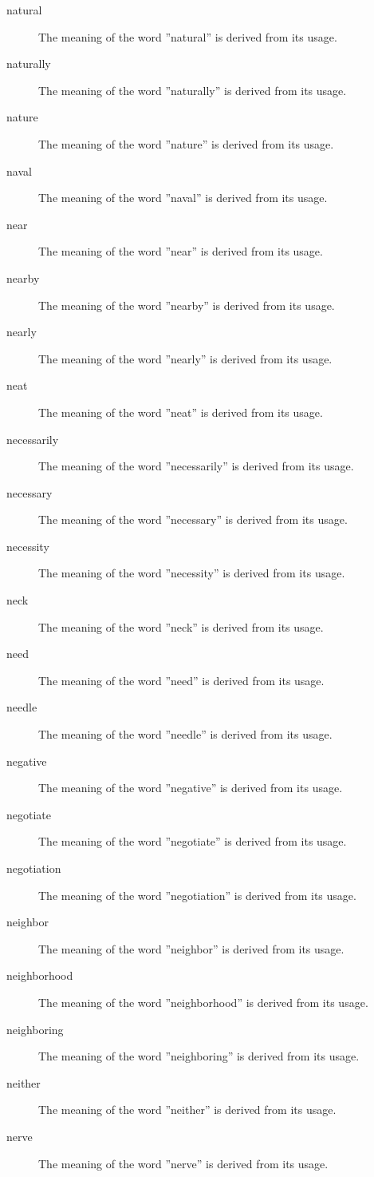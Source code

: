 \documentclass[12pt, letterpaper]{memoir}
\begin{document}
\begin{description}
\item[natural] The meaning of the word ''natural'' is derived from its usage.
\item[naturally] The meaning of the word ''naturally'' is derived from its usage.
\item[nature] The meaning of the word ''nature'' is derived from its usage.
\item[naval] The meaning of the word ''naval'' is derived from its usage.
\item[near] The meaning of the word ''near'' is derived from its usage.
\item[nearby] The meaning of the word ''nearby'' is derived from its usage.
\item[nearly] The meaning of the word ''nearly'' is derived from its usage.
\item[neat] The meaning of the word ''neat'' is derived from its usage.
\item[necessarily] The meaning of the word ''necessarily'' is derived from its usage.
\item[necessary] The meaning of the word ''necessary'' is derived from its usage.
\item[necessity] The meaning of the word ''necessity'' is derived from its usage.
\item[neck] The meaning of the word ''neck'' is derived from its usage.
\item[need] The meaning of the word ''need'' is derived from its usage.
\item[needle] The meaning of the word ''needle'' is derived from its usage.
\item[negative] The meaning of the word ''negative'' is derived from its usage.
\item[negotiate] The meaning of the word ''negotiate'' is derived from its usage.
\item[negotiation] The meaning of the word ''negotiation'' is derived from its usage.
\item[neighbor] The meaning of the word ''neighbor'' is derived from its usage.
\item[neighborhood] The meaning of the word ''neighborhood'' is derived from its usage.
\item[neighboring] The meaning of the word ''neighboring'' is derived from its usage.
\item[neither] The meaning of the word ''neither'' is derived from its usage.
\item[nerve] The meaning of the word ''nerve'' is derived from its usage.

\end{description}
\end{document}
